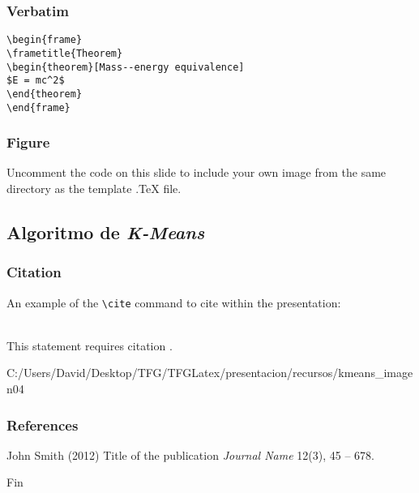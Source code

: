 \documentclass{beamer}
\begin{document}
\begin{frame}[fragile]
\frametitle{Verbatim}
\begin{example}
\begin{verbatim}
\begin{frame}
\frametitle{Theorem}
\begin{theorem}[Mass--energy equivalence]
$E = mc^2$
\end{theorem}
\end{frame}\end{verbatim}
\end{example}
\end{frame}


\begin{frame}
\frametitle{Figure}
Uncomment the code on this slide to include your own image from the same directory as the template .TeX file.
\end{frame}

\subsection{Algoritmo de \textit{K-Means}}

\begin{frame}[fragile]
\frametitle{Citation}
An example of the \verb|\cite| command to cite within the presentation:\\~

This statement requires citation \cite{p1}.
\end{frame}

\begin{frame} %
  {C:/Users/David/Desktop/TFG/TFGLatex/presentacion/recursos/kmeans_imagen}{0}{4}
\end{frame}

\begin{frame}
\frametitle{References}
\footnotesize{
\begin{thebibliography}{99} %
 John Smith (2012)
\newblock Title of the publication
\newblock \emph{Journal Name} 12(3), 45 -- 678.
\end{thebibliography}
}
\end{frame}


\begin{frame}
\Huge{\centerline{Fin}}
\end{frame}

\end{document}
